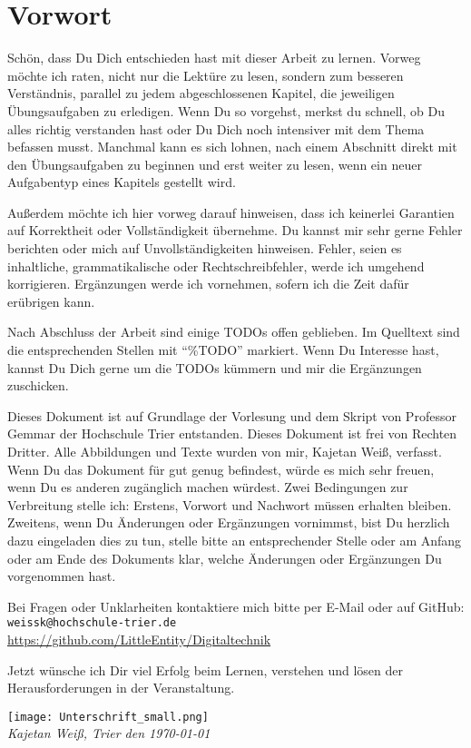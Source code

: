 \chapter*{Vorwort}
Schön, dass Du Dich entschieden hast mit dieser Arbeit zu lernen. Vorweg möchte ich raten, nicht nur die Lektüre zu lesen, sondern zum besseren Verständnis, parallel zu jedem abgeschlossenen Kapitel, die jeweiligen Übungsaufgaben zu erledigen. Wenn Du so vorgehst, merkst du schnell, ob Du alles richtig verstanden hast oder Du Dich noch intensiver mit dem Thema befassen musst. Manchmal kann es sich lohnen, nach einem Abschnitt direkt mit den Übungsaufgaben zu beginnen und erst weiter zu lesen, wenn ein neuer Aufgabentyp eines Kapitels gestellt wird.

Außerdem möchte ich hier vorweg darauf hinweisen, dass ich keinerlei Garantien auf Korrektheit oder Vollständigkeit übernehme. Du kannst mir sehr gerne Fehler berichten oder mich auf Unvollständigkeiten hinweisen. Fehler, seien es inhaltliche, grammatikalische oder Rechtschreibfehler, werde ich umgehend korrigieren. Ergänzungen werde ich vornehmen, sofern ich die Zeit dafür erübrigen kann.

Nach Abschluss der Arbeit sind einige TODOs offen geblieben. Im Quelltext sind die entsprechenden Stellen mit "`\%TODO"' markiert. Wenn Du Interesse hast, kannst Du Dich gerne um die TODOs kümmern und mir die Ergänzungen zuschicken.

Dieses Dokument ist auf Grundlage der Vorlesung und dem Skript von Professor Gemmar der Hochschule Trier entstanden. Dieses Dokument ist frei von Rechten Dritter. Alle Abbildungen und Texte wurden von mir, Kajetan Weiß, verfasst. Wenn Du das Dokument für gut genug befindest, würde es mich sehr freuen, wenn Du es anderen zugänglich machen würdest. Zwei Bedingungen zur Verbreitung stelle ich: Erstens, Vorwort und Nachwort müssen erhalten bleiben. Zweitens, wenn Du Änderungen oder Ergänzungen vornimmst, bist Du herzlich dazu eingeladen dies zu tun, stelle bitte an entsprechender Stelle oder am Anfang oder am Ende des Dokuments klar, welche Änderungen oder Ergänzungen Du vorgenommen hast.

Bei Fragen oder Unklarheiten kontaktiere mich bitte per E-Mail oder auf GitHub: \\
\texttt{weissk@hochschule-trier.de} \\
\url{https://github.com/LittleEntity/Digitaltechnik}

Jetzt wünsche ich Dir viel Erfolg beim Lernen, verstehen und lösen der Herausforderungen in der Veranstaltung.

\texttt{[image: Unterschrift\_small.png]}\\
\textsl{Kajetan Weiß, Trier den \today}